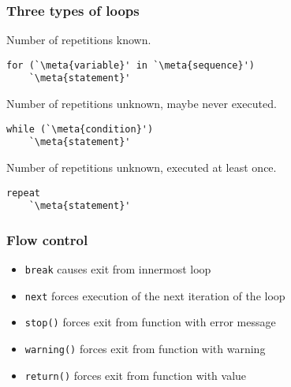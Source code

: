\begin{frame}[fragile=singleslide]
  \frametitle{Three types of loops}

  Number of repetitions known.
  \begin{Schunk}
\begin{lstlisting}
for (`\meta{variable}' in `\meta{sequence}')
    `\meta{statement}'
\end{lstlisting}
  \end{Schunk}

  Number of repetitions unknown, maybe never executed.
  \begin{Schunk}
\begin{lstlisting}
while (`\meta{condition}')
    `\meta{statement}'
\end{lstlisting}
  \end{Schunk}

  Number of repetitions unknown, executed at least once.
  \begin{Schunk}
\begin{lstlisting}
repeat
    `\meta{statement}'
\end{lstlisting}
  \end{Schunk}
\end{frame}

\begin{frame}
  \frametitle{Flow control}

  \begin{itemize}
  \item \texttt{break} causes exit from innermost loop
  \item \texttt{next} forces execution of the next iteration of
    the loop
  \item \texttt{stop()} forces exit from function with error message
  \item \texttt{warning()} forces exit from function with warning
  \item \texttt{return()} forces exit from function with value
  \end{itemize}

  \pause
\end{frame}

